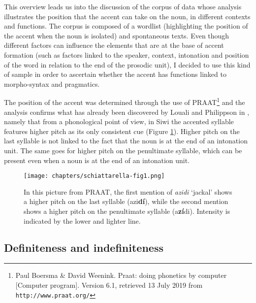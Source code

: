 \documentclass[output=paper]{langsci/langscibook}
\begin{document}
This overview leads us into the discussion of the corpus of data whose analysis illustrates the position that the accent can take on the noun, in different contexts and functions. The corpus is composed of a wordlist (highlighting the position of the accent when the noun is isolated) and spontaneous texts. Even though different factors can influence the elements that are at the base of accent formation (such as factors linked to the speaker, context, intonation and position of the word in relation to the end of the prosodic unit), I decided to use this kind of sample in order to ascertain whether the accent has functions linked to morpho-syntax and pragmatics.

The position of the accent was determined through the use of PRAAT\footnote{Paul Boersma \& David Weenink. Praat: doing phonetics by computer [Computer program]. Version 6.1, retrieved 13 July 2019 from {\footnotesize{\texttt{http://www.praat.org/}}} } and the analysis confirms what has already been discovered by Louali and Philippson in \citeyear{louali:philippson:04}, namely that from a phonological point of view, in Siwi the accented syllable features higher pitch as its only consistent cue (Figure \ref{5fig:1}). Higher pitch on the last syllable is not linked to the fact that the noun is at the end of an intonation unit. The same goes for higher pitch on the penultimate syllable, which can be present even when a noun is at the end of an intonation unit. 

\begin{figure}
\centering
\texttt{[image: chapters/schiattarella-fig1.png]}
\caption{In this picture from PRAAT, the first mention of {\emph{azidi}} `jackal' shows a higher pitch on the last syllable (azi{\textbf{dí}}), while the second mention shows a higher pitch on the penultimate syllable (a{\textbf{zí}}di). Intensity is indicated by the lower and lighter line.}\label{5fig:1}
\end{figure}


\subsection{Definiteness and indefiniteness}\label{5sec:14}
\end{document}
